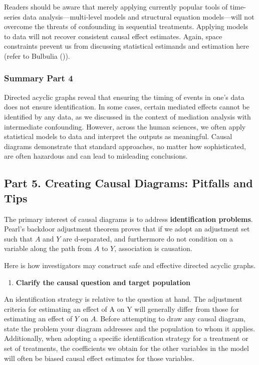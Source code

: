 \documentclass[
  single column]{article}
\providecommand{\tightlist}{%
  \setlength{\itemsep}{0pt}\setlength{\parskip}{0pt}}\usepackage{longtable,booktabs,array}
\begin{document}
Readers should be aware that merely applying currently popular tools of
time-series data analysis---multi-level models and structural equation
models---will not overcome the threats of confounding in sequential
treatments. Applying models to data will not recover consistent causal
effect estimates. Again, space constraints prevent us from discussing
statistical estimands and estimation here (refer to Bulbulia
()).

\subsubsection{Summary Part 4}\label{summary-part-4}

Directed acyclic graphs reveal that ensuring the timing of events in
one's data does not ensure identification. In some cases, certain
mediated effects cannot be identified by any data, as we discussed in
the context of mediation analysis with intermediate confounding.
However, across the human sciences, we often apply statistical models to
data and interpret the outputs as meaningful. Causal diagrams
demonstrate that standard approaches, no matter how sophisticated, are
often hazardous and can lead to misleading conclusions.

\subsection{Part 5. Creating Causal Diagrams: Pitfalls and
Tips}\label{id-sec-5}

The primary interest of causal diagrams is to address
\textbf{identification problems}. Pearl's backdoor adjustment theorem
proves that if we adopt an adjustment set such that \(A\) and \(Y\) are
d-separated, and furthermore do not condition on a variable along the
path from \(A\) to \(Y\), association is causation.

Here is how investigators may construct safe and effective directed
acyclic graphs.

\begin{enumerate}
\def\labelenumi{\arabic{enumi}.}
\tightlist
\item
  \textbf{Clarify the causal question and target population}
\end{enumerate}

An identification strategy is relative to the question at hand. The
adjustment criteria for estimating an effect of A on Y will generally
differ from those for estimating an effect of \(Y\) on \(A\). Before
attempting to draw any causal diagram, state the problem your diagram
addresses and the population to whom it applies. Additionally, when
adopting a specific identification strategy for a treatment or set of
treatments, the coefficients we obtain for the other variables in the
model will often be biased causal effect estimates for those variables.
\end{document}
